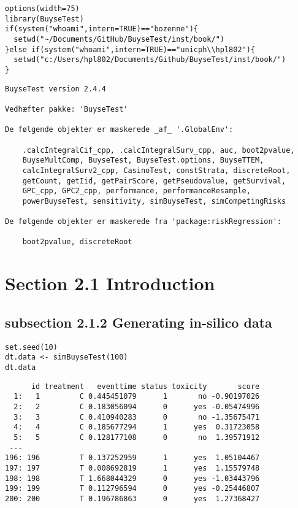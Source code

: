\documentclass[12pt]{article}
\date{\today}
\title{}
\begin{document}
\lstset{language=r,label= ,caption= ,captionpos=b,numbers=none}
\begin{lstlisting}
options(width=75)
library(BuyseTest)
if(system("whoami",intern=TRUE)=="bozenne"){
  setwd("~/Documents/GitHub/BuyseTest/inst/book/")
}else if(system("whoami",intern=TRUE)=="unicph\\hpl802"){
  setwd("c:/Users/hpl802/Documents/Github/BuyseTest/inst/book/")
}
\end{lstlisting}

\begin{verbatim}
BuyseTest version 2.4.4

Vedhæfter pakke: 'BuyseTest'

De følgende objekter er maskerede _af_ '.GlobalEnv':

    .calcIntegralCif_cpp, .calcIntegralSurv_cpp, auc, boot2pvalue,
    BuyseMultComp, BuyseTest, BuyseTest.options, BuyseTTEM,
    calcIntegralSurv2_cpp, CasinoTest, constStrata, discreteRoot,
    getCount, getIid, getPairScore, getPseudovalue, getSurvival,
    GPC_cpp, GPC2_cpp, performance, performanceResample,
    powerBuyseTest, sensitivity, simBuyseTest, simCompetingRisks

De følgende objekter er maskerede fra 'package:riskRegression':

    boot2pvalue, discreteRoot
\end{verbatim}

\section{Section 2.1 Introduction}
\label{sec:org5c906f5}
\subsection{subsection 2.1.2 Generating in-silico data}
\label{sec:org003c0da}
\lstset{language=r,label= ,caption= ,captionpos=b,numbers=none}
\begin{lstlisting}
set.seed(10)
dt.data <- simBuyseTest(100)
dt.data
\end{lstlisting}

\begin{verbatim}
      id treatment   eventtime status toxicity       score
  1:   1         C 0.445451079      1       no -0.90197026
  2:   2         C 0.183056094      0      yes -0.05474996
  3:   3         C 0.410940283      0       no -1.35675471
  4:   4         C 0.185677294      1      yes  0.31723058
  5:   5         C 0.128177108      0       no  1.39571912
 ---                                                      
196: 196         T 0.137252959      1      yes  1.05104467
197: 197         T 0.008692819      1      yes  1.15579748
198: 198         T 1.668044329      0      yes -1.03443796
199: 199         T 0.112796594      0      yes -0.25446807
200: 200         T 0.196786863      0      yes  1.27368427
\end{verbatim}
\end{document}
